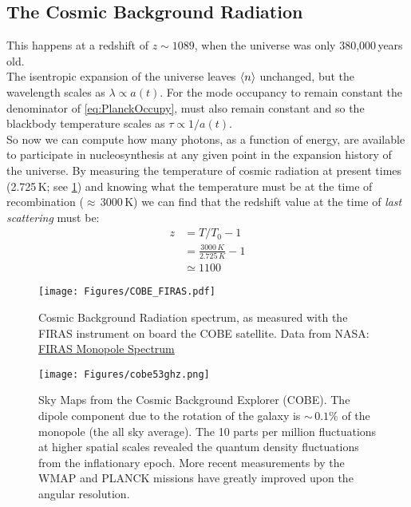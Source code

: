 \subsection{The Cosmic Background Radiation}
\label{sec:CBR}
This happens at a redshift of $z \sim 1089$, when the universe was only 380,000\,years old.\\

The isentropic expansion of the universe leaves $\Braket{n}$ unchanged, but the wavelength scales as $\lambda \propto a(t)$. For the mode occupancy to remain constant the denominator of \cref{eq:PlanckOccupy}, must also remain constant and so the blackbody temperature scales as $\tau \propto 1/a(t)$. \\


So now we can compute how many photons, as a function of energy, are available to participate in nucleosynthesis at any given point in the expansion history of the universe. By measuring the temperature of cosmic radiation at present times (2.725\,K; see \cref{fig:FIRAS}) and knowing what the temperature must be at the time of recombination ($\approx$\,3000\,K) we can find that the redshift value at the time of \textit{last scattering} must be:
\begin{align}
z &= T/T_0 - 1 \\
  &= \frac{3000\,K}{2.725\,K} - 1 \\
  &\simeq 1100
\end{align}

\begin{figure}[!h]
\centering
\texttt{[image: Figures/COBE\_FIRAS.pdf]}
\caption{Cosmic Background Radiation spectrum, as measured with the FIRAS instrument on board the COBE satellite. Data from NASA: \href{http://lambda.gsfc.nasa.gov/product/cobe/firas_prod_table.cfm}{FIRAS Monopole Spectrum}}
\label{fig:FIRAS}
\end{figure}

\begin{figure}[!h]
\centering
\texttt{[image: Figures/cobe53ghz.png]}
\caption{Sky Maps from the Cosmic Background Explorer (COBE). The dipole component due to the rotation of the galaxy is $\sim\,0.1\%$ of the monopole (the all sky average). The 10 parts per
million fluctuations at higher spatial scales revealed the quantum density fluctuations from the
inflationary epoch. More recent measurements by the WMAP and PLANCK missions have greatly improved
upon the angular resolution.}
\label{fig:COBEsky}
\end{figure}

